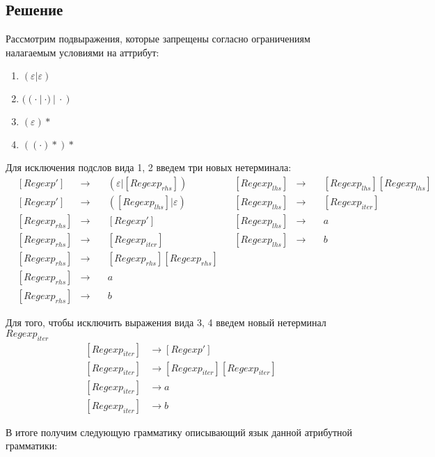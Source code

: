 \documentclass[a4paper, 14pt]{article}
\begin{document}
\subsection{Решение}

Рассмотрим подвыражения, которые запрещены согласно ограничениям налагаемым условиями на аттрибут:

\begin{enumerate}
  \item{$(\varepsilon | \varepsilon)$}
  \item{$((\cdot \ | \ \cdot )\ | \ \cdot)$}
  \item{$(\varepsilon)*$}
  \item{$((\cdot)*)*$}
\end{enumerate}

Для исключения подслов вида 1, 2 введем три новых нетерминала:
$$
\begin{aligned}
  &[Regexp'] &\rightarrow \quad &{(\varepsilon|[Regexp_{rhs}])} & &[Regexp_{lhs}] &\rightarrow \quad &{[Regexp_{lhs}][Regexp_{lhs}]} \\
  &[Regexp'] &\rightarrow \quad &{([Regexp_{lhs}]|\varepsilon)} & &[Regexp_{lhs}] &\rightarrow \quad  &{[Regexp_{iter}]} \\
  &[Regexp_{rhs}] &\rightarrow \quad &{[Regexp']} & &[Regexp_{lhs}] &\rightarrow \quad  &a\\ 
  &[Regexp_{rhs}] &\rightarrow \quad &{[Regexp_{iter}]} & &[Regexp_{lhs}] &\rightarrow \quad  &b\\ 
  &[Regexp_{rhs}] &\rightarrow \quad &{[Regexp_{rhs}][Regexp_{rhs}]} \\
  &[Regexp_{rhs}] &\rightarrow \quad &a \\
  &[Regexp_{rhs}] &\rightarrow \quad &b
\end{aligned}
$$


Для того, чтобы исключить выражения вида 3, 4 введем новый нетерминал $Regexp_{iter}$
$$
\begin{aligned}
  [Regexp_{iter}] &\rightarrow [Regexp'] \\
  [Regexp_{iter}] &\rightarrow [Regexp_{iter}][Regexp_{iter}] \\
  [Regexp_{iter}] &\rightarrow a \\
  [Regexp_{iter}] &\rightarrow b
\end{aligned}
$$


В итоге получим следующую грамматику описывающий язык данной атрибутной грамматики: 
\end{document}
